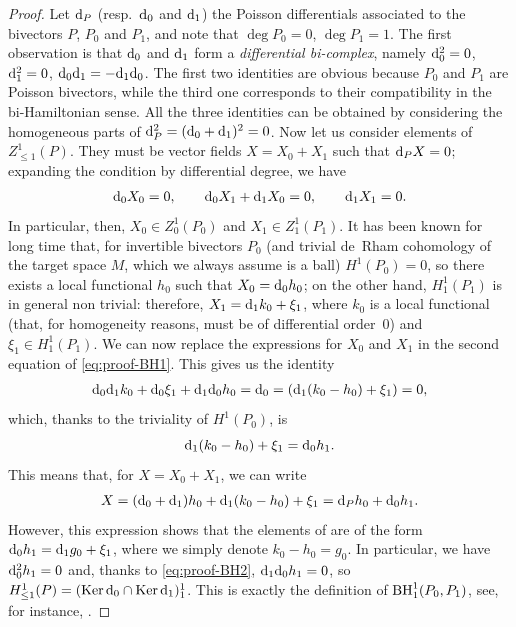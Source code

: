 \documentclass[pdftex]{sigma}
\numberwithin{equation}{section}
\begin{document}
\begin{proof}
Let ${\rm d}_P$ (resp.\ ${\rm d}_0$ and ${\rm d}_1$) the Poisson differentials associated to the bivectors $P$, $P_0$ and $P_1$, and note that $\deg P_0=0$, $\deg P_1=1$. The first observation is that ${\rm d}_0$ and ${\rm d}_1$ form a \emph{differential bi-complex}, namely ${\rm d}_0^2=0$, ${\rm d}_1^2=0$, ${\rm d}_0{\rm d}_1=-{\rm d}_1{\rm d}_0$. The first two identities are obvious because $P_0$ and $P_1$ are Poisson bivectors, while the third one corresponds to their compatibility in the bi-Hamiltonian sense. All the three identities can be obtained by considering the homogeneous parts of ${\rm d}_P^2=({\rm d}_0+{\rm d}_1)^2=0$. Now let us consider elements of $Z^1_{\leq 1}(P)$. They must be vector fields $X=X_0+X_1$ such that ${\rm d}_P X=0$; expanding the condition by differential degree, we have
\begin{gather}\label{eq:proof-BH1}
 {\rm d}_0 X_0=0,\qquad {\rm d}_0X_1+{\rm d}_1X_0=0,\qquad {\rm d}_1X_1=0.
\end{gather}
In particular, then, $X_0\in Z^1_0(P_0)$ and $X_1\in Z^1_1(P_1)$. It has been known for long time \cite{getzler} that, for invertible bivectors $P_0$ (and trivial de~Rham cohomology of the target space $M$, which we always assume is a ball) $H^1(P_0)=0$, so there exists a local functional $h_0$ such that $X_0={\rm d}_0h_0$; on the other hand, $H^1_1(P_1)$ is in general non trivial: therefore, $X_1={\rm d}_1 k_0 + \xi_1$, where $k_0$ is a local functional (that, for homogeneity reasons, must be of differential order~0) and $\xi_1\in H^1_1(P_1)$. We can now replace the expressions for $X_0$ and $X_1$ in the second equation of \eqref{eq:proof-BH1}. This gives us the identity
\begin{gather*}
{\rm d}_0{\rm d}_1k_0+{\rm d}_0\xi_1+{\rm d}_1{\rm d}_0h_0={\rm d}_0=({\rm d}_1(k_0-h_0)+\xi_1)=0,
\end{gather*}
which, thanks to the triviality of $H^1(P_0)$, is
\begin{equation}\label{eq:proof-BH2}
{\rm d}_1(k_0-h_0)+\xi_1={\rm d}_0 h_1.
\end{equation}
This means that, for $X=X_0+X_1$, we can write
\begin{gather*}
X=({\rm d}_0+{\rm d}_1)h_0+{\rm d}_1(k_0-h_0)+\xi_1={\rm d}_P h_0 + {\rm d}_0h_1.
\end{gather*}
However, this expression shows that the elements of  are of the form ${\rm d}_0h_1={\rm d}_1 g_0+\xi_1$, where we simply denote $k_0-h_0=g_0$. In particular, we have ${\rm d}_0^2h_1=0$ and, thanks to \eqref{eq:proof-BH2}, ${\rm d}_1{\rm d}_0h_1=0$, so $H^1_{\leq 1}(P)= (\operatorname{Ker} {\rm d}_0\cap\operatorname{Ker} {\rm d}_1 )^1_{1}$. This is exactly the definition of ${\rm BH}^1_{1}(P_0,P_1)$, see, for instance, \cite{dubrovin2001normal,lz05}.
\end{proof}
\end{document}

